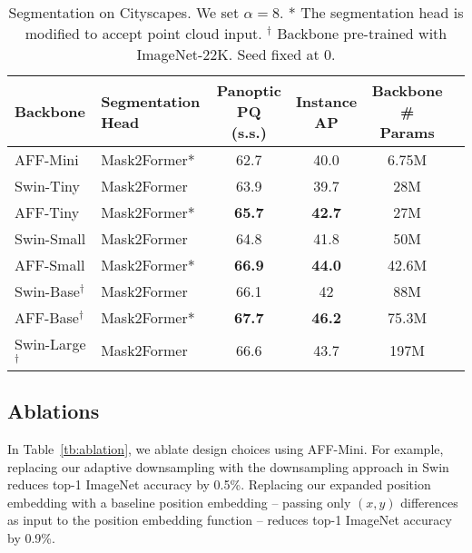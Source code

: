\documentclass[10pt,twocolumn,letterpaper]{article}
\begin{document}
\begin{table}
\begin{center}
\begin{footnotesize}
\begin{tabular}{llcccc}
Backbone & \makecell{Segmentation\\Head} & \makecell{Panoptic \\PQ (s.s.)} & \makecell{Instance\\AP} & \makecell{Backbone\\\# Params} 
\\\hline
AFF-Mini & Mask2Former*~\cite{mask2} & 62.7 & 40.0 & 6.75M 
\\\hdashline
Swin-Tiny & Mask2Former~\cite{mask2} & 63.9 & 39.7 & 28M 
\\
AFF-Tiny & Mask2Former*~\cite{mask2} & \textbf{65.7} & \textbf{42.7} & 27M 
\\
\hdashline
Swin-Small & Mask2Former~\cite{mask2} & 64.8 & 41.8 & 50M\\ 
AFF-Small & Mask2Former*~\cite{mask2} & \textbf{66.9} & \textbf{44.0} & 42.6M\\ \hdashline
Swin-Base$^\dagger$ & Mask2Former~\cite{mask2} & 66.1 & 42 & 88M \\
AFF-Base$^\dagger$ & Mask2Former*~\cite{mask2} & \textbf{67.7} & \textbf{46.2} & 75.3M\\ \hdashline
Swin-Large$^\dagger$ & Mask2Former~\cite{mask2} & 66.6 & 43.7 & 197M\\ 
\hline
\end{tabular}
\end{footnotesize}
\end{center}
\vspace{-0.55cm}
\caption{Segmentation on Cityscapes. We set $\alpha=8$. * The segmentation head is modified to accept point cloud input. $^\dagger$ Backbone pre-trained with ImageNet-22K. Seed fixed at 0.}
\label{tb:cityscapes}
\vskip -0.15in
\end{table}

\subsection{Ablations}

In Table~\ref{tb:ablation}, we ablate design choices using AFF-Mini. For example, replacing our adaptive downsampling with the downsampling approach in Swin\cite{swin} reduces top-1 ImageNet accuracy by 0.5\%. Replacing our expanded position embedding with a baseline position embedding -- passing only $(x,y)$ differences as input to the position embedding function -- reduces top-1 ImageNet accuracy by 0.9\%. 
\end{document}
